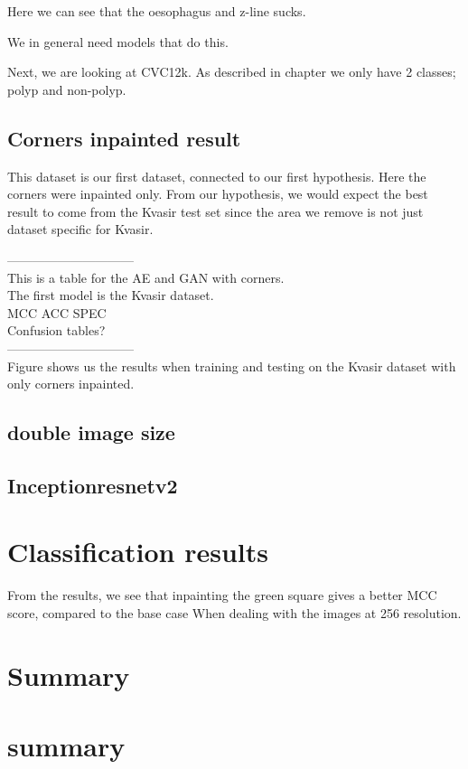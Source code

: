 Here we can see that the oesophagus and z-line sucks. 

We in general need models that do this. 

Next, we are looking at CVC12k. As described in chapter  we only have 2 classes; polyp and non-polyp.





\subsection{Corners inpainted result}
This dataset is our first dataset, connected to our first hypothesis. Here the corners were inpainted only.  
From our hypothesis, we would expect the best result to come from the Kvasir test set since the area we remove is not just dataset specific for Kvasir.

\vspace{5px}
------------------------------\\
This is a table for the AE and GAN with corners.\\
The first model is the Kvasir dataset.\\
MCC ACC SPEC \\
Confusion tables?\\
------------------------------\\

Figure  shows us the results when training and testing on the Kvasir dataset with only corners inpainted. 


\subsection{double image size}

\subsection{Inceptionresnetv2}


\section{Classification results}
From the results, we see that inpainting the green square gives a better MCC score, compared to the base case When dealing with the images at 256 resolution. 



\section{Summary}



   
 



\section{summary}

















